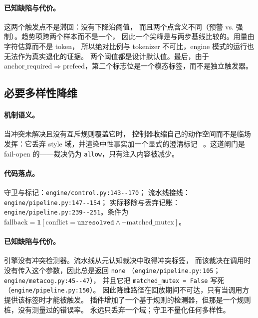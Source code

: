 \paragraph{已知缺陷与代价。} 这两个触发点不是滞回：没有下降沿阈值，
而且两个点含义不同（预警 vs. 强制）。趋势项跨两个样本而不是一个，
因此一个尖峰是与两步基线比较的。用量由字符估算而不是 token，
所以绝对比例与 tokenizer 不可比，engine 模式的运行也无法作为真实退化的证据。
两个阈值都是设计默认值。最后，由于 $\mathrm{anchor\_required} \Rightarrow
\mathrm{prefeed}$，第二个标志位是一个模态标签，而不是独立触发器。

\subsection{必要多样性降维}

\paragraph{机制语义。} 当冲突未解决且没有互斥规则覆盖它时，
控制器收缩自己的动作空间而不是临场发挥：它丢弃 style 域，并渲染中性事实加一个显式的澄清标记
~\cite{ashby1956}。这道闸门是 fail-open 的——裁决仍为 \texttt{allow}，只有注入内容被减少。

\paragraph{代码落点。} 守卫与标记：\texttt{engine/\allowbreak{}control.\allowbreak{}py:\allowbreak{}143-\allowbreak{}-\allowbreak{}170}；
流水线接线：\texttt{engine/\allowbreak{}pipeline.\allowbreak{}py:\allowbreak{}147-\allowbreak{}-\allowbreak{}154}；
实际移除与丢弃记账：\texttt{engine/\allowbreak{}pipeline.\allowbreak{}py:\allowbreak{}239-\allowbreak{}-\allowbreak{}251}。条件为
$\mathrm{fallback} = \mathbf{1}[\mathrm{conflict} = \texttt{unresolved} \land
\neg \mathrm{matched\_mutex}]$。

\paragraph{已知缺陷与代价。} 引擎没有冲突检测器。流水线从元认知裁决中取得冲突标签，
而该裁决在调用时没有传入这个参数，因此总是返回 \texttt{none}
（\texttt{engine/\allowbreak{}pipeline.\allowbreak{}py:\allowbreak{}105}；\texttt{engine/\allowbreak{}metacog.\allowbreak{}py:\allowbreak{}45-\allowbreak{}-\allowbreak{}47}），
并且它把 \texttt{matched\_\allowbreak{}mutex = False} 写死（\texttt{engine/\allowbreak{}pipeline.\allowbreak{}py:\allowbreak{}150}）。
因此降维路径在回放期间不可达，只有当调用方提供该标签时才能被触发。
插件增加了一个基于规则的检测器，但那是一个规则桩，没有测量过的错误率。
永远只丢弃一个域；守卫不量化任何多样性。

